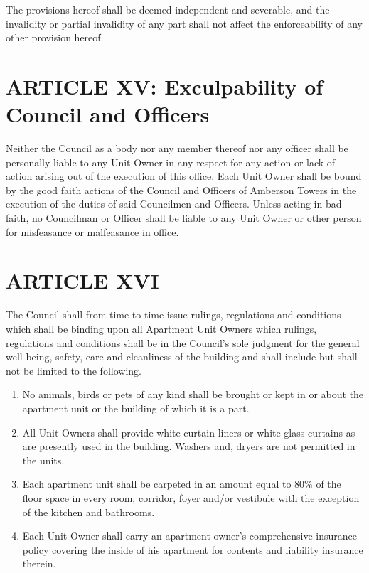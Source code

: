 \documentclass[
  14pt,
]{book}
\providecommand{\tightlist}{%
  \setlength{\itemsep}{0pt}\setlength{\parskip}{0pt}}
\begin{document}
The provisions hereof shall be deemed independent and severable, and the invalidity or partial invalidity of any part shall not affect the enforceability of any other provision hereof.

\hypertarget{article-xv-exculpability-of-council-and-officers}{%
\section*{ARTICLE XV: Exculpability of Council and Officers}\label{article-xv-exculpability-of-council-and-officers}}

Neither the Council as a body nor any member thereof nor any officer shall be personally liable to any Unit Owner in any respect for any action or lack of action arising out of the execution of this office. Each Unit Owner shall be bound by the good faith actions of the Council and Officers of Amberson Towers in the execution of the duties of said Councilmen and Officers. Unless acting in bad faith, no Councilman or Officer shall be liable to any Unit Owner or other person for misfeasance or malfeasance in office.

\hypertarget{article-xvi}{%
\section*{ARTICLE XVI}\label{article-xvi}}

The Council shall from time to time issue rulings, regulations and conditions which shall be binding upon all Apartment Unit Owners which rulings, regulations and conditions shall be in the Council's sole judgment for the general well-being, safety, care and cleanliness of the building and shall include but shall not be limited to the following.

\begin{enumerate}
\def\labelenumi{\arabic{enumi}.}
\tightlist
\item
  No animals, birds or pets of any kind shall be brought or kept in or about the apartment unit or the building of which it is a part.
\item
  All Unit Owners shall provide white curtain liners or white glass curtains as are presently used in the building. Washers and, dryers are not permitted in the units.
\item
  Each apartment unit shall be carpeted in an amount equal to 80\% of the floor space in every room, corridor, foyer and/or vestibule with the exception of the kitchen and bathrooms.
\item
  Each Unit Owner shall carry an apartment owner's comprehensive insurance policy covering the inside of his apartment for contents and liability insurance therein.
\end{enumerate}
\end{document}
